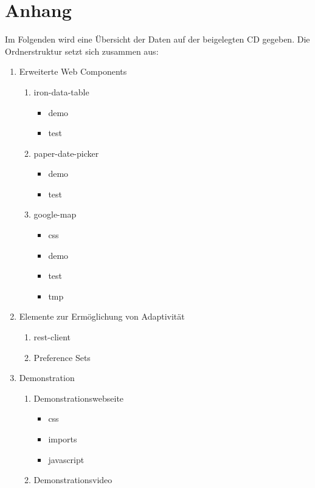 \documentclass[12pt, paper=a4, bibtotoc, toc=listof, headsepline=true, numbers=endperiod]{scrreprt}
\begin{document}
\chapter*{Anhang}
Im Folgenden wird eine Übersicht der Daten auf der beigelegten CD gegeben. Die Ordnerstruktur setzt sich zusammen aus:
\begin{enumerate}
\item Erweiterte Web Components
	\begin{enumerate}
	\item iron-data-table 
	\begin{itemize}
		\item demo
		\item test
	\end{itemize}
	\item paper-date-picker
	\begin{itemize}
		\item demo
		\item test
	\end{itemize}
	\item google-map
	\begin{itemize}
		\item css
		\item demo
		\item test
		\item tmp
	\end{itemize}
	\end{enumerate}
\item Elemente zur Ermöglichung von Adaptivität
	\begin{enumerate}
		\item rest-client
		\item Preference Sets
	\end{enumerate}  
\item Demonstration
	\begin{enumerate}
		\item Demonstrationswebseite
		\begin{itemize}
			\item css
			\item imports
			\item javascript
		\end{itemize}
		\item Demonstrationsvideo
	\end{enumerate}
\end{enumerate}

	
\end{document}
